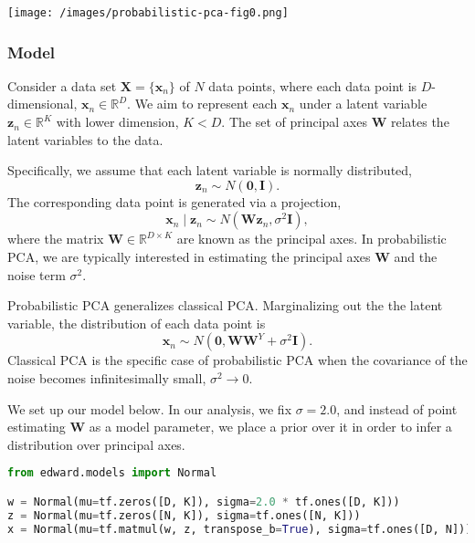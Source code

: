\texttt{[image: /images/probabilistic-pca-fig0.png]}

\subsubsection{Model}

Consider a data set $\mathbf{X} = \{\mathbf{x}_n\}$ of $N$ data
points, where each data point is $D$-dimensional, $\mathbf{x}_n \in
\mathbb{R}^D$. We aim to represent each $\mathbf{x}_n$ under a latent
variable $\mathbf{z}_n \in \mathbb{R}^K$ with lower dimension, $K <
D$. The set of principal axes $\mathbf{W}$ relates the latent variables to
the data.

Specifically, we assume that each latent variable is normally distributed,
\begin{equation*}
\mathbf{z}_n \sim N(\mathbf{0}, \mathbf{I}).
\end{equation*}
The corresponding data point is generated via a projection,
\begin{equation*}
\mathbf{x}_n \mid \mathbf{z}_n
\sim N(\mathbf{W}\mathbf{z}_n, \sigma^2\mathbf{I}),
\end{equation*}
where the matrix $\mathbf{W}\in\mathbb{R}^{D\times K}$ are known as
the principal axes. In probabilistic PCA, we are typically interested in
estimating the principal axes $\mathbf{W}$ and the noise term
$\sigma^2$.

Probabilistic PCA generalizes classical PCA. Marginalizing out the the
latent variable, the distribution of each data point is
\begin{equation*}
\mathbf{x}_n \sim N(\mathbf{0}, \mathbf{W}\mathbf{W}^Y + \sigma^2\mathbf{I}).
\end{equation*}
Classical PCA is the specific case of probabilistic PCA when the
covariance of the noise becomes infinitesimally small, $\sigma^2 \to
0$.

We set up our model below. In our analysis, we fix $\sigma=2.0$, and
instead of point estimating $\mathbf{W}$ as a model parameter, we
place a prior over it in order to infer a distribution over principal
axes.

\begin{lstlisting}[language=Python]
from edward.models import Normal

w = Normal(mu=tf.zeros([D, K]), sigma=2.0 * tf.ones([D, K]))
z = Normal(mu=tf.zeros([N, K]), sigma=tf.ones([N, K]))
x = Normal(mu=tf.matmul(w, z, transpose_b=True), sigma=tf.ones([D, N]))

\end{lstlisting}

